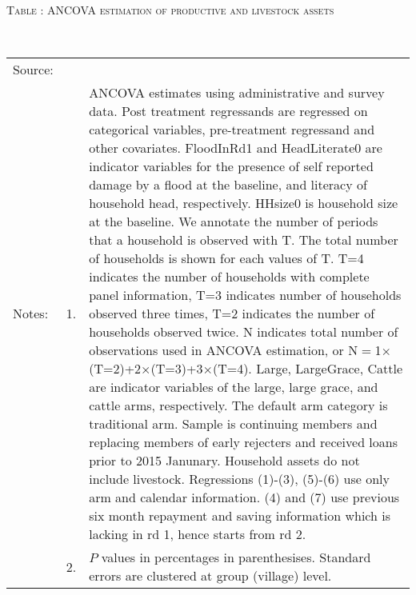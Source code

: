 \hspace{-1cm}\begin{minipage}[t]{14cm}
\hfil\textsc{\normalsize Table \thetable: ANCOVA estimation of productive and livestock assets\label{tab ANCOVA productive and livestock assets}}\\
\setlength{\tabcolsep}{1pt}
\setlength{\baselineskip}{8pt}
\renewcommand{\arraystretch}{.55}
\hfil{}\\
\renewcommand{\arraystretch}{.8}
\setlength{\tabcolsep}{1pt}
\begin{tabular}{>{\hfill\scriptsize}p{1cm}<{}>{\hfill\scriptsize}p{.25cm}<{}>{\scriptsize}p{12cm}<{\hfill}}
Source:& \multicolumn{2}{l}{\scriptsize Estimated with GUK administrative and survey data.}\\
Notes: & 1. & ANCOVA estimates using administrative and survey data. Post treatment regressands are regressed on categorical variables, pre-treatment regressand and other covariates. \textsf{FloodInRd1} and \textsf{HeadLiterate0} are indicator variables for the presence of self reported damage by a flood at the baseline, and literacy of household head, respectively. \textsf{HHsize0} is household size at the baseline. We annotate the number of periods that a household is observed with \textsf{T}. The total number of households is shown for each values of \textsf{T}. \textsf{T=4} indicates the number of households with complete panel information, \textsf{T=3} indicates number of households observed three times, \textsf{T=2} indicates the number of households observed twice. \textsf{N} indicates total number of observations used in ANCOVA estimation, or \textsf{N$=$1$\times$(T=2)+2$\times$(T=3)+3$\times$(T=4)}.  \textsf{Large}, \textsf{LargeGrace}, \textsf{Cattle} are indicator variables of the \textsf{large}, \textsf{large grace}, and \textsf{cattle} arms, respectively. The default arm category is \textsf{traditional} arm. Sample is continuing members and replacing members of early rejecters and received loans prior to 2015 Janunary. Household assets do not include livestock. Regressions (1)-(3), (5)-(6) use only arm and calendar information. (4) and (7) use previous six month repayment and saving information which is lacking in rd 1, hence starts from rd 2.\\
& 2. & $P$ values in percentages in parenthesises. Standard errors are clustered at group (village) level.
\end{tabular}
\end{minipage}

